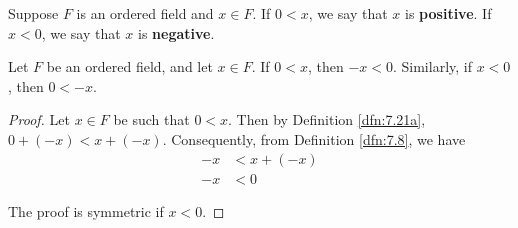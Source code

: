 \documentclass[../main.tex]{subfiles}
\begin{document}
\begin{definition}\label{dfn:7.22}
    Suppose $F$ is an ordered field and $x\in F$. If $0<x$, we say that $x$ is \textbf{positive}. If $x<0$, we say that $x$ is \textbf{negative}.
\end{definition}

\begin{lemma}\label{lem:7.23}
    Let $F$ be an ordered field, and let $x\in F$. If $0<x$, then $-x<0$. Similarly, if $x<0$, then $0<-x$.
    \begin{proof}
        Let $x\in F$ be such that $0<x$. Then by Definition \ref{dfn:7.21a}, $0+(-x)<x+(-x)$. Consequently, from Definition \ref{dfn:7.8}, we have
        \begin{align*}
            -x &< x+(-x)\tag*{FA3}\\
            -x &< 0\tag*{FA4}
        \end{align*}\par
        The proof is symmetric if $x<0$.
    \end{proof}
\end{lemma}
\end{document}

